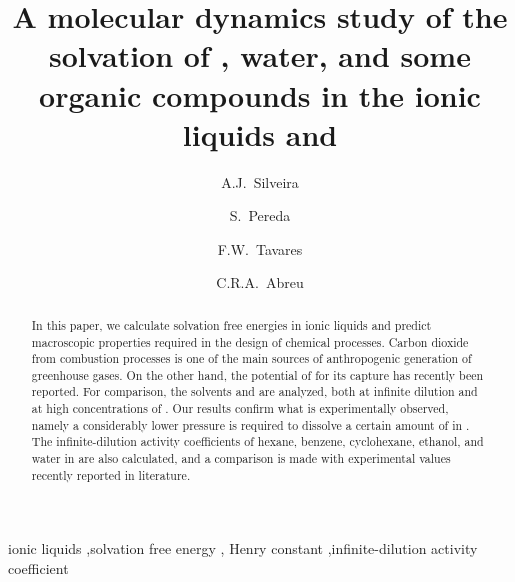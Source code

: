 \documentclass[3p,twocolumn]{elsarticle}
\begin{document}
\begin{frontmatter}

\title{A molecular dynamics study of the solvation of , water, and some organic compounds in the ionic liquids \ce{[emim][B(CN)_4]} and \ce{[emim][NTf_2]}}

\author[plapiqui,msk]{A.J.~Silveira}
\author[plapiqui]{S.~Pereda}
\author[eq-ufrj,coppe-ufrj]{F.W.~Tavares}
\author[eq-ufrj]{C.R.A.~Abreu}

\address[plapiqui]{Planta Piloto de Ingenier\'ia Qu\'imica (PLAPIQUI), Universidad Nacional del Sur, Bah\'ia Blanca, Argentina}
\address[msk]{Computational \& Systems Biology Program, Memorial Sloan Kettering Cancer Center, New York, NY, USA}
\address[eq-ufrj]{Chemical Engineering Department, Escola de Qu\'imica, Universidade Federal do Rio de Janeiro, Rio de Janeiro, Brazil}
\address[coppe-ufrj]{Chemical Engineering Program, Alberto Luiz Coimbra Institute for Graduate Studies and Research in Engineering (COPPE), Universidade Federal do Rio de Janeiro, Rio de Janeiro, Brazil}


\begin{abstract}
In this paper, we calculate solvation free energies in ionic liquids and predict macroscopic properties required in the design of chemical processes.
Carbon dioxide from combustion processes is one of the main sources of anthropogenic generation of greenhouse gases.
On the other hand, the potential of \ce{[emim][B(CN)_4]} for its capture has recently been reported.
For comparison, the solvents \ce{[emim][B(CN)_4]} and \ce{[emim][NTf_2]} are analyzed, both at infinite dilution and at high concentrations of .
Our results confirm what is experimentally observed, namely a considerably lower pressure is required to dissolve a certain amount of  in \ce{[emim][B(CN)_4]}.
The infinite-dilution activity coefficients of hexane, benzene, cyclohexane, ethanol, and water in \ce{[emim][B(CN)_4]} are also calculated, and a comparison is made with experimental values recently reported in literature.
\end{abstract}

\begin{keyword}
ionic liquids \sep solvation free energy \sep  {} Henry constant \sep infinite-dilution activity coefficient 
\end{keyword}

\end{frontmatter}
\end{document}
